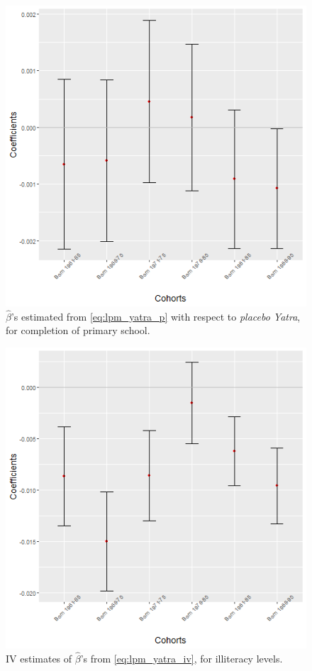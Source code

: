 \documentclass{article}
\begin{document}
\begin{figure}[H]
    \centering
    \includegraphics[scale = 0.4]{images/graph_coeff_col_p.png}
    \caption{$\hat{\beta}$'s estimated from \eqref{eq:lpm_yatra_p} with respect to \textit{placebo Yatra}, for completion of primary school.}
    \label{fig:coeff_col_p}
\end{figure}

\newpage
\begin{figure}[H]
    \centering
    \includegraphics[scale = 0.5]{images/graph_coeff_ill_iv.png}
    \caption{IV estimates of $\hat{\beta}$'s from \eqref{eq:lpm_yatra_iv}, for illiteracy levels.}
    \label{fig:coeff_ill_iv}
\end{figure}
\end{document}
